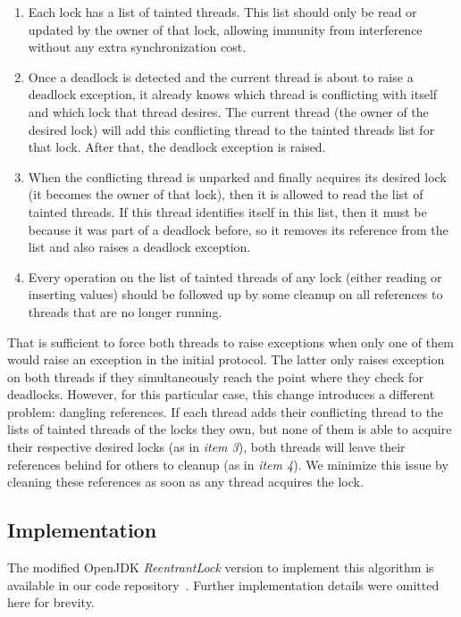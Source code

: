 \begin{enumerate}
\item Each lock has a list of tainted threads. This list should only be read or updated by the owner of that lock, allowing immunity from interference without any extra synchronization cost.
\item Once a deadlock is detected and the current thread is about to raise a deadlock exception, it already knows which thread is conflicting with itself and which lock that thread desires. The current thread (the owner of the desired lock) will add this conflicting thread to the tainted threads list for that lock. After that, the deadlock exception is raised.
\item When the conflicting thread is unparked and finally acquires its desired lock (it becomes the owner of that lock), then it is allowed to read the list of tainted threads. If this thread identifies itself in this list, then it must be because it was part of a deadlock before, so it removes its reference from the list and also raises a deadlock exception.
\item Every operation on the list of tainted threads of any lock (either reading or inserting values) should be followed up by some cleanup on all references to threads that are no longer running.
\end{enumerate}

That is sufficient to force both threads to raise exceptions when only one of them would raise an exception in the initial protocol. The latter only raises exception on both threads if they simultaneously reach the point where they check for deadlocks. However, for this particular case, this change introduces a different problem: dangling references.
If each thread adds their conflicting thread to the lists of tainted threads of the locks they own, 
but none of them is able to acquire their respective desired locks (as in \emph{item 3}),
both threads will leave their references behind for others to cleanup (as in \emph{item 4}).
We minimize this issue by cleaning these references as soon as any thread acquires the lock.

\subsection{Implementation}

The modified OpenJDK \emph{ReentrantLock} version to implement this algorithm is available in our code repository~\cite{repo}. Further implementation details were omitted here for brevity.




